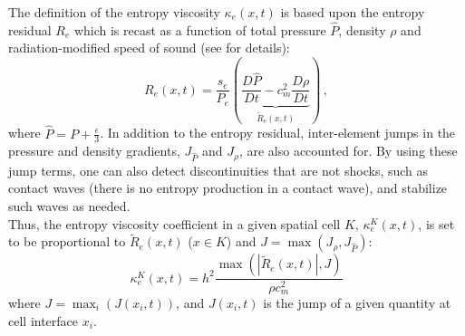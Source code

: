 \documentclass[times]{fldauth}
\begin{document}
The definition of the entropy viscosity $\kappa_e(x,t)$ is based upon the entropy residual $R_e$ which is recast as a function of 
total pressure $\hat{P}$, density $\rho$ and radiation-modified speed of sound (see \cite{our_jcp_radhy_paper} for details):
%
\begin{equation}
\label{eq:equation9}
R_e(x,t) = \frac{s_e}{P_e} \left(  \underbrace{ \frac{D\hat{P}}{Dt} - c_m^2 \frac{D\rho}{Dt} }_\textrm{$\tilde{R}_e(x,t)$} \right) \, ,
\end{equation}
where $\hat{P} = P + \frac{\epsilon}{3}$.
 
%
In addition to the entropy residual, inter-element jumps in the pressure and density gradients, $J_{\hat{P}}$ and $J_{\rho}$, are also accounted for. 
By using these jump terms, one can also detect discontinuities that are not shocks, such as contact waves (there is no entropy production in a contact wave), 
and stabilize such waves as needed. \\
Thus, the entropy viscosity coefficient in a given spatial cell $K$, $\kappa^K_e(x,t)$, is set to be proportional to $\tilde{R}_e(x,t)$ ($x \in K$)
and $J= \max( J_{\rho}, J_{\hat{P}})$: 
\begin{equation}
\label{eq:equation12}
\kappa^K_e(x,t) = h^2 \frac{\max (|\tilde{R}_e(x,t)|, J)}{\rho c^2_m}
\end{equation} 
where $J = \max_i (J(x_i,t))$, and $J(x_i,t)$ is the jump of a given quantity at cell interface $x_i$. 
\end{document}
